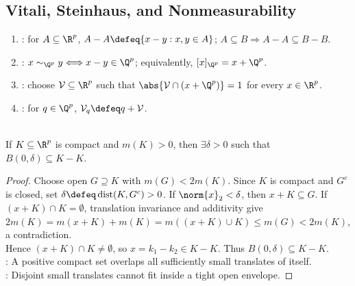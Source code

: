 \subsection{Vitali, Steinhaus, and Nonmeasurability}

\begin{definition} \label{def:difference-set-and-vitali-selector} 
\begin{enumerate}[label=(\roman*)]
\setlength{\itemsep}{0pt}
\item {}: for $A\subseteq\R^p$, $A-A\defeq\{x-y:x,y\in A\}$; $A\subseteq B\Longrightarrow A-A\subseteq B-B$.
\item {}: $x\sim_{\Q^p}y\Longleftrightarrow x-y\in\Q^p$; equivalently, $[x]_{\Q^p}=x+\Q^p$.
\item {}: choose $\mathcal{V}\subseteq\R^p$ such that $\abs{\mathcal{V}\cap(x+\Q^p)}=1$ for every $x\in\R^p$.
\item {}: for $q\in\Q^p$, $\mathcal{V}_q\defeq q+\mathcal{V}$.
\end{enumerate}
\end{definition}

\begin{lemma} \label{lem:steinhaus-compact-positive-measure} \\
If $K\subseteq\R^p$ is compact and $m(K)>0$, then $\exists\delta>0$ such that $B(0,\delta)\subseteq K-K$.
\begin{proof}
Choose open $G\supseteq K$ with $m(G)<2m(K)$. Since $K$ is compact and $G^c$ is closed, set $\delta\defeq\operatorname{dist}(K,G^c)>0$. If $\norm{x}_2<\delta$, then $x+K\subseteq G$. If $(x+K)\cap K=\emptyset$, translation invariance and additivity give\\
$2m(K)=m(x+K)+m(K)=m((x+K)\cup K)\leq m(G)<2m(K)$, a contradiction.\\
Hence $(x+K)\cap K\neq\emptyset$, so $x=k_1-k_2\in K-K$. Thus $B(0,\delta)\subseteq K-K$.\\
: A positive compact set overlaps all sufficiently small translates of itself.\\
: Disjoint small translates cannot fit inside a tight open envelope.
\end{proof}
\end{lemma}

